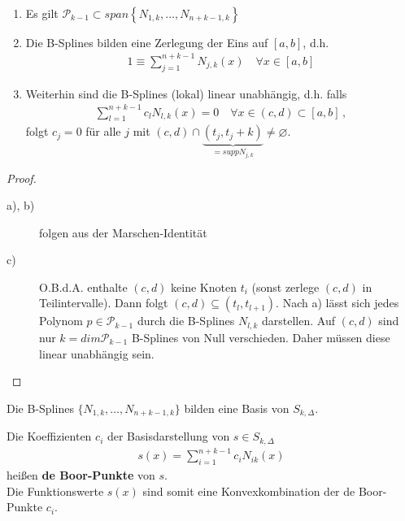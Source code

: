 \begin{Satze}\label{6.2.10}~
\begin{enumerate}
\item Es gilt 
  $\mathcal{P}_{k-1}\subset
  span\left\{N_{1,k}, \dots, N_{n+k-1,k}\right\}$
\item Die B-Splines bilden eine Zerlegung der Eins auf $[a,b]$,
  d.h. 
\begin{gather*}
  1\equiv \sum_{j=1}^{n+k-1}N_{j,k}(x) \quad \forall x\in[a,b]
\end{gather*}
\item Weiterhin sind die B-Splines (lokal) linear unabhängig,
  d.h. falls
  \begin{gather*}
    \sum_{l=1}^{n+k-1}c_lN_{l,k}(x)=0 
    \quad\forall x\in(c,d)\subset [a,b]\,,
  \end{gather*}
folgt $c_j=0$ für alle $j$ mit 
$(c,d)\cap \underbrace{(t_j,t_j+k)}_{=supp N_{j,k}}\neq \varnothing$.
\label{im6.2.10}
\end{enumerate}

\begin{proof}~
  \begin{description}
    \item[a), b)] folgen aus der Marschen-Identität 
      \cite[siehe z.B.][]{deuflhardhohmann}
    \item[c)] O.B.d.A. enthalte $(c,d)$ keine Knoten $t_i$
      (sonst zerlege $(c,d)$ in Teilintervalle).
      Dann folgt $(c,d)\subseteq (t_l, t_{l+1})$.
      Nach a) lässt sich jedes Polynom $p\in \mathcal{P}_{k-1}$
      durch die B-Splines $N_{l,k}$ darstellen.
      Auf $(c,d)$ sind nur $k=dim\mathcal{P}_{k-1}$
      B-Splines von Null verschieden.
      Daher müssen diese linear unabhängig sein.
  \end{description}
\end{proof}
\end{Satze}

\begin{Fole}
  Die B-Splines $\{N_{1,k},\ldots,N_{n+k-1,k}\}$ bilden eine Basis von 
  $S_{k,\Delta}$.

  Die Koeffizienten $c_i$ der Basisdarstellung von $s \in S_{k,\Delta}$
  \begin{gather*}
    s(x)=\sum_{i=1}^{n+k-1}c_iN_{ik}(x)
  \end{gather*}
  heißen \textbf{de Boor-Punkte} von $s$. \\
  Die Funktionswerte $s(x)$ sind somit eine
  Konvexkombination der de Boor-Punkte $c_i$.
\end{Fole}


